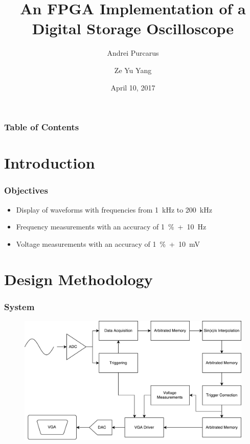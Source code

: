 \documentclass[pdf]{beamer}
\title{\textbf{An FPGA Implementation of a \\ Digital Storage Oscilloscope}}
\author{
    Andrei Purcarus \and Ze Yu Yang
}
\institute{
	ECSE 487 \\
	McGill University
}
\date{April 10, 2017}
\begin{document}
\maketitle

\begin{frame}
\frametitle{Table of Contents}
\tableofcontents
\end{frame}

\section{Introduction}

\begin{frame}
\frametitle{Objectives}
\begin{itemize}
\item Display of waveforms with frequencies from 1~kHz to 200~kHz
\item Frequency measurements with an accuracy of 1~\%~+~10~Hz
\item Voltage measurements with an accuracy of 1~\%~+~10~mV
\end{itemize}
\end{frame}

\section{Design Methodology}

\begin{frame}
\frametitle{System}
\begin{figure}[!htb]
  \includegraphics[width=\linewidth]{diagrams/system.pdf}
\end{figure}
\end{frame}
\end{document}

